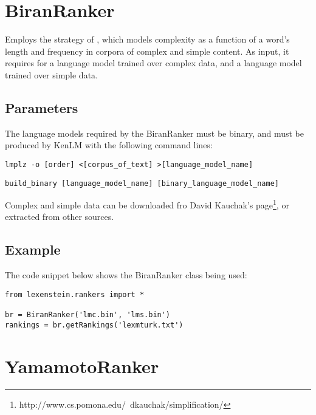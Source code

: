 \section{BiranRanker}

Employs the strategy of \cite{Biran2011}, which models complexity as a function of a word's length and frequency in corpora of complex and simple content. As input, it requires for a language model trained over complex data, and a language model trained over simple data.

\subsection{Parameters}

The language models required by the BiranRanker must be binary, and must be produced by KenLM with the following command lines:

\begin{lstlisting}
lmplz -o [order] <[corpus_of_text] >[language_model_name]
\end{lstlisting}
\begin{lstlisting}
build_binary [language_model_name] [binary_language_model_name]
\end{lstlisting}

Complex and simple data can be downloaded fro David Kauchak's page\footnote{http://www.cs.pomona.edu/~dkauchak/simplification/}, or extracted from other sources.

\subsection{Example}

The code snippet below shows the BiranRanker class being used:

\begin{lstlisting}
from lexenstein.rankers import *

br = BiranRanker('lmc.bin', 'lms.bin')
rankings = br.getRankings('lexmturk.txt')
\end{lstlisting}















\section{YamamotoRanker}

